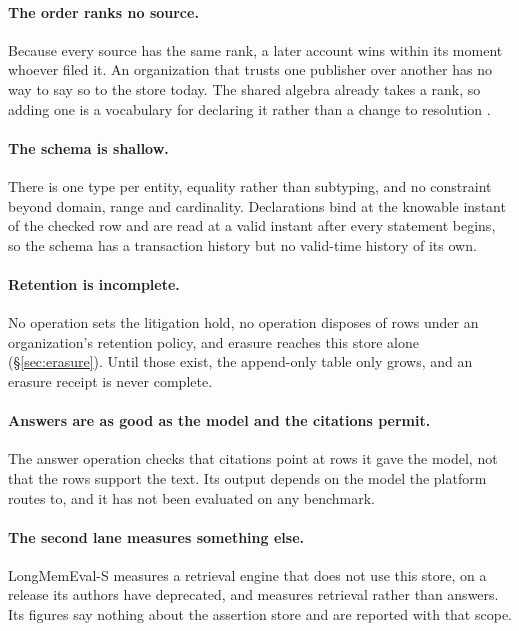 \paragraph{The order ranks no source.}
Because every source has the same rank, a later account wins within its moment
whoever filed it. An organization that trusts one publisher over another has no
way to say so to the store today. The shared algebra already takes a rank, so
adding one is a vocabulary for declaring it rather than a change to resolution
\proposed{}.

\paragraph{The schema is shallow.}
There is one type per entity, equality rather than subtyping, and no constraint
beyond domain, range and cardinality. Declarations bind at the knowable instant
of the checked row and are read at a valid instant after every statement begins,
so the schema has a transaction history but no valid-time history of its own.

\paragraph{Retention is incomplete.}
No operation sets the litigation hold, no operation disposes of rows under an
organization's retention policy, and erasure reaches this store alone
(\S\ref{sec:erasure}). Until those exist, the append-only table only grows, and
an erasure receipt is never complete.

\paragraph{Answers are as good as the model and the citations permit.}
The answer operation checks that citations point at rows it gave the model, not that
the rows support the text. Its output depends on the model the platform routes
to, and it has not been evaluated on any benchmark.

\paragraph{The second lane measures something else.}
LongMemEval-S measures a retrieval engine that does not use this store, on a
release its authors have deprecated, and measures retrieval rather than answers.
Its figures say nothing about the assertion store and are reported with that
scope.
